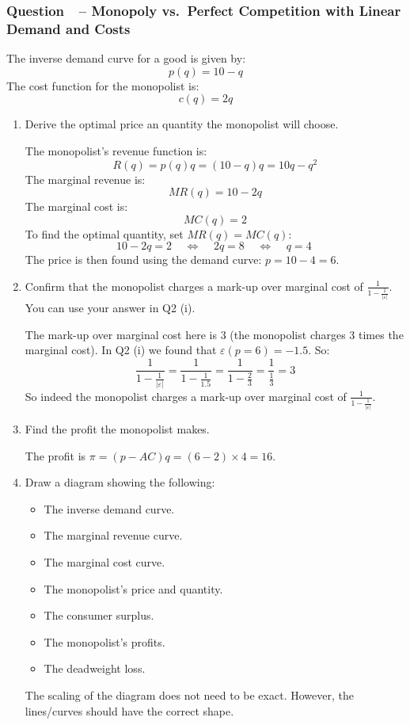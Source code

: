 \documentclass[12pt]{article}
\newcounter{question}[section]
\newcommand{\question}[1]{\refstepcounter{question}
  \subsubsection*{Question~\thequestion~-- #1}}
\newenvironment{subquestions}{
  \begin{enumerate}[label=(\roman*)]}{\end{enumerate}}
\begin{document}
\question{Monopoly vs.~Perfect Competition with Linear Demand and Costs}
The inverse demand curve for a good is given by:
\[
  p\left( q \right)=10-q
\]
The cost function for the monopolist is:
\[
  c\left(  q\right)=2q
\]
\begin{subquestions}
  \item Derive the optimal price an quantity the monopolist will choose.

    \textcolor{solution-color}{
      The monopolist's revenue function is:
      \[
        R\left( q \right)=p\left( q \right)q = \left( 10-q \right)q=10q-q^2
      \]
      The marginal revenue is:
      \[
        MR\left( q \right)=10-2q
      \]
      The marginal cost is:
      \[
        MC\left( q \right)=2
      \]
      To find the optimal quantity, set $MR\left( q \right)=MC\left( q
      \right)$:
      \[
        10-2q=2 \;\;\;\;\Longleftrightarrow\;\;\;\;
        2q=8 \;\;\;\;\Longleftrightarrow\;\;\;\;
        q=4\
      \]
      The price is then found using the demand curve: $p=10-4=6$.
    }
  \item Confirm that the monopolist charges a mark-up over marginal cost of
    $\frac{1}{1-\frac{1}{\left| \varepsilon \right|}}$. You can use your
    answer in Q2 (i).

    \textcolor{solution-color}{
      The mark-up over marginal cost here is 3 (the monopolist charges 3 times
      the marginal cost).
      In Q2 (i) we found that $\varepsilon\left( p=6 \right)=-1.5$.
      So:
      \[
        \frac{1}{1-\frac{1}{\left| \varepsilon
        \right|}}=\frac{1}{1-\frac{1}{1.5}}=\frac{1}{1-\frac{2}{3}}=\frac{1}{\frac{1}{3}}=3
      \]
      So indeed the monopolist charges a mark-up over marginal cost of
      $\frac{1}{1-\frac{1}{\left| \varepsilon \right|}}$.
    }
  \item Find the profit the monopolist makes.

    \textcolor{solution-color}{
      The profit is $\pi=\left( p-AC \right)q=\left( 6-2 \right)\times
      4=16$.
    }

  \item Draw a diagram showing the following:
    \begin{itemize}
      \item The inverse demand curve.
      \item The marginal revenue curve.
      \item The marginal cost curve.
      \item The monopolist's price and quantity.
      \item The consumer surplus.
      \item The monopolist's profits.
      \item The deadweight loss.
    \end{itemize}
    The scaling of the diagram does not need to be exact. However, the
    lines/curves should have the correct shape.


\end{subquestions}
\end{document}
